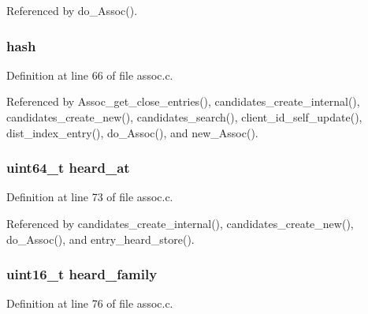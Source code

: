 Referenced by do\+\_\+\+Assoc().

\hypertarget{struct_client__entry_a35aa0f6864b81ef3de3d4d46ef823a0c}{
\subsubsection[{hash}]{ hash}}\label{struct_client__entry_a35aa0f6864b81ef3de3d4d46ef823a0c}


Definition at line 66 of file assoc.\+c.



Referenced by Assoc\+\_\+get\+\_\+close\+\_\+entries(), candidates\+\_\+create\+\_\+internal(), candidates\+\_\+create\+\_\+new(), candidates\+\_\+search(), client\+\_\+id\+\_\+self\+\_\+update(), dist\+\_\+index\+\_\+entry(), do\+\_\+\+Assoc(), and new\+\_\+\+Assoc().

\hypertarget{struct_client__entry_a0886ba8c555aa6352f2dbf0606636f13}{
\subsubsection[{heard\+\_\+at}]{\setlength{\rightskip}{0pt plus 5cm}uint64\+\_\+t heard\+\_\+at}}\label{struct_client__entry_a0886ba8c555aa6352f2dbf0606636f13}


Definition at line 73 of file assoc.\+c.



Referenced by candidates\+\_\+create\+\_\+internal(), candidates\+\_\+create\+\_\+new(), do\+\_\+\+Assoc(), and entry\+\_\+heard\+\_\+store().

\hypertarget{struct_client__entry_a1b6b0c24ebf14b86b051d63bd47ffb27}{
\subsubsection[{heard\+\_\+family}]{\setlength{\rightskip}{0pt plus 5cm}uint16\+\_\+t heard\+\_\+family}}\label{struct_client__entry_a1b6b0c24ebf14b86b051d63bd47ffb27}


Definition at line 76 of file assoc.\+c.



